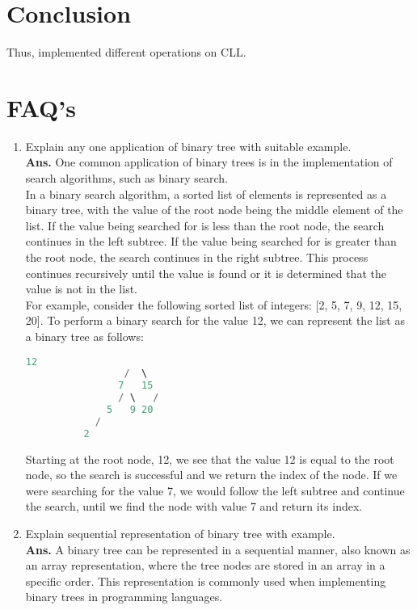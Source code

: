 \documentclass{article}
\begin{document}
\section{\textbf{Conclusion}}
Thus, implemented different operations on CLL.
\section{\textbf{FAQ's}}
\begin{enumerate}
	\item  Explain any one application of binary tree with suitable example.\\
	
	\textbf{Ans.} One common application of binary trees is in the implementation of search algorithms, such as binary search.\\
	
	In a binary search algorithm, a sorted list of elements is represented as a binary tree, with the value of the root node being the middle element of the list. If the value being searched for is less than the root node, the search continues in the left subtree. If the value being searched for is greater than the root node, the search continues in the right subtree. This process continues recursively until the value is found or it is determined that the value is not in the list.\\
	
	For example, consider the following sorted list of integers: [2, 5, 7, 9, 12, 15, 20]. To perform a binary search for the value 12, we can represent the list as a binary tree as follows:
		\begin{lstlisting}[language=C++, caption = Example]
			      12
			     /  \
		    	7   15
		    	/ \   /
			  5   9 20
		   	/
		  2
		\end{lstlisting}
	Starting at the root node, 12, we see that the value 12 is equal to the root node, so the search is successful and we return the index of the node. If we were searching for the value 7, we would follow the left subtree and continue the search, until we find the node with value 7 and return its index.
	\item Explain sequential representation of binary tree with example.\\
	
	\textbf{Ans.} A binary tree can be represented in a sequential manner, also known as an array representation, where the tree nodes are stored in an array in a specific order. This representation is commonly used when implementing binary trees in programming languages.\\
	

\end{enumerate}
\end{document}
